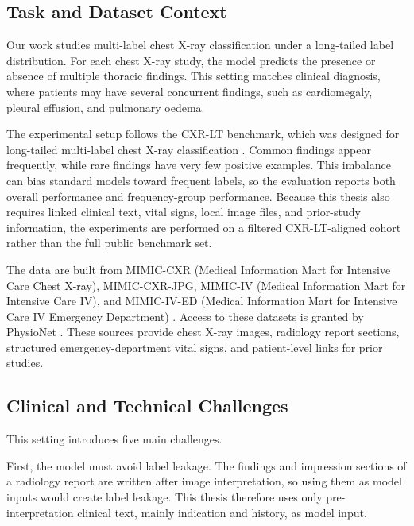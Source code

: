 \subsection{Task and Dataset Context}\label{subsec}

Our work studies multi-label chest X-ray classification under a long-tailed label distribution. For each chest X-ray study, the model predicts the presence or absence of multiple thoracic findings. This setting matches clinical diagnosis, where patients may have several concurrent findings, such as cardiomegaly, pleural effusion, and pulmonary oedema.

The experimental setup follows the CXR-LT benchmark, which was designed for long-tailed multi-label chest X-ray classification \cite{holste2024cxrlt,holste2025cxrlt2024}. Common findings appear frequently, while rare findings have very few positive examples. This imbalance can bias standard models toward frequent labels, so the evaluation reports both overall performance and frequency-group performance. Because this thesis also requires linked clinical text, vital signs, local image files, and prior-study information, the experiments are performed on a filtered CXR-LT-aligned cohort rather than the full public benchmark set.

The data are built from MIMIC-CXR (Medical Information Mart for Intensive Care Chest X-ray), MIMIC-CXR-JPG, MIMIC-IV (Medical Information Mart for Intensive Care IV), and MIMIC-IV-ED (Medical Information Mart for Intensive Care IV Emergency Department) \cite{johnson2019mimiccxr,PhysioNet-mimic-cxr-jpg-2.0.0,johnson2024mimiciv,johnson2023mimicived}. Access to these datasets is granted by PhysioNet \cite{goldberger2000physionet}. These sources provide chest X-ray images, radiology report sections, structured emergency-department vital signs, and patient-level links for prior studies.

\subsection{Clinical and Technical Challenges}\label{subsec}

This setting introduces five main challenges.

First, the model must avoid label leakage. The findings and impression sections of a radiology report are written after image interpretation, so using them as model inputs would create label leakage. This thesis therefore uses only pre-interpretation clinical text, mainly indication and history, as model input.

